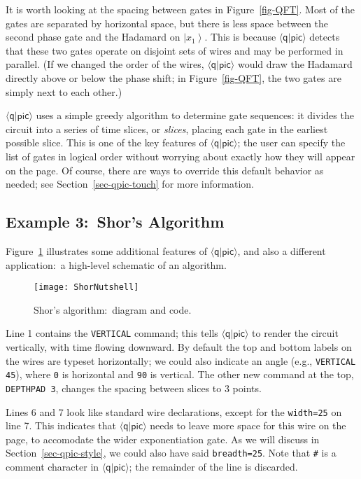\documentclass[twoside,12pt]{article}
\newcommand{\qpic}{$\langle\mathsf{q}|\mathsf{pic}\rangle$\xspace}
\providecommand{\ket}[1]{\left|#1\right\rangle}
\begin{document}
It is worth looking at the spacing between gates in Figure~\ref{fig-QFT}.
Most of the gates are separated by horizontal space, but there is less space
between the second phase gate and the Hadamard on $\ket{x_1}$.  This is
because \qpic detects that these two gates operate on disjoint sets of
wires and may be performed in parallel.  (If we changed the order of the
wires, \qpic would draw the Hadamard directly above or below the
phase shift; in Figure~\ref{fig-QFT}, the two gates are simply next to each other.)


\qpic uses a simple greedy algorithm to determine gate sequences:  it
divides the circuit into a series of time slices, or \emph{slices}, placing each gate
in the earliest possible slice.  This is one of the key features of
\qpic; the user can specify the list of gates in logical order without
worrying about exactly how they will appear on the page.  Of course, there
are ways to override this default behavior as needed; see
Section~\ref{sec-qpic-touch} for more information.

\subsection{Example 3:\ Shor's Algorithm}


Figure~\ref{fig-Shor} illustrates some additional features of \qpic, and
also a different application:\ a high-level schematic of an algorithm.


\begin{figure}[h!]
\begin{center}
\texttt{[image: ShorNutshell]}
\begin{minipage}{5.4in}

\end{minipage}
\end{center}
\caption{Shor's algorithm:\ diagram and code.}
\label{fig-Shor}
\end{figure}


Line 1 contains the {\tt VERTICAL} command; this tells \qpic to render the
circuit vertically, with time flowing downward.  By default the top and
bottom labels on the wires are typeset horizontally; we could also indicate
an angle (e.g., {\tt VERTICAL 45}), where {\tt 0} is horizontal and {\tt 90} is vertical.
The other
new command at the top, {\tt DEPTHPAD 3}, changes the spacing between
slices to 3 points.


Lines 6 and 7 look like standard wire declarations, except for the
{\tt width=25} on line 7.  This indicates that \qpic needs to leave more space
for this wire on the page, to accomodate the wider exponentiation gate.
As we will discuss in Section~\ref{sec-qpic-style}, we could also have said
{\tt breadth=25}.  Note that {\tt \#} is a comment
character in \qpic; the remainder of the line is discarded.
\end{document}
